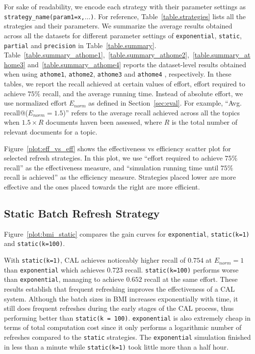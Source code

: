 For sake of readability, we encode each strategy with their parameter
settings as \texttt{strategy\_name(param1=x,$\ldots$)}. For reference, Table~\ref{table.strategies}
lists all the strategies and their parameters.
We summarize the average results obtained across all the datasets for different
parameter settings of \texttt{exponential}, \texttt{static},
\texttt{partial} and \texttt{precision} in Table~\ref{table.summary}.
Table~\ref{table.summary_athome1},~\ref{table.summary_athome2},~\ref{table.summary_athome3}
and~\ref{table.summary_athome4} reports the dataset-level results obtained when
using \texttt{athome1}, \texttt{athome2}, \texttt{athome3} and \texttt{athome4}
, respectively.
In these tables, we report the recall achieved at certain values of effort, effort required to
achieve $75\%$ recall, and the average running time. Instead of absolute effort,
we use normalized effort $E_{norm}$ as defined in Section~\ref{sec:eval}. For
example, ``Avg. recall@($E_{norm}=1.5$)'' refers to the average recall achieved
across all the topics when $1.5 \times R$ documents haven been assessed, where $R$
is the total number of relevant documents for a topic.

Figure~\ref{plot:eff_vs_eff} shows the effectiveness vs efficiency scatter plot
for selected refresh strategies. In this plot, we use ``effort required to
achieve $75\%$ recall''
as the effectiveness measure, and ``simulation running time until $75\%$
recall is achieved'' as the efficiency measure. Strategies placed lower are more
effective and the ones placed towards the right are more
efficient.

\subsection*{Static Batch Refresh Strategy}
Figure~\ref{plot:bmi_static} compares the gain curves for \texttt{exponential},
\texttt{static(k=1)} and \texttt{static(k=100)}.

With \texttt{static(k=1)}, CAL achieves noticeably higher recall of
$0.754$ at $E_{norm} = 1$ than \texttt{exponential} which achieves $0.723$
recall.  \texttt{static(k=100)} performs worse than
\texttt{exponential}, managing to achieve $0.652$ recall at the same effort.
These results establish that frequent refreshing improves the effectiveness of a
CAL system.
Although the batch sizes in BMI increases exponentially with time, it still does
frequent refreshes during the early stages of the CAL process, thus performing
better than \texttt{static(k = 100)}. \texttt{exponential} is also
extremely cheap in terms of total computation cost since it only performs a
logarithmic number of refreshes compared to the \texttt{static} strategies.
The \texttt{exponential} simulation finished in less than a minute while
\texttt{static(k=1)} took little more than a half hour.

